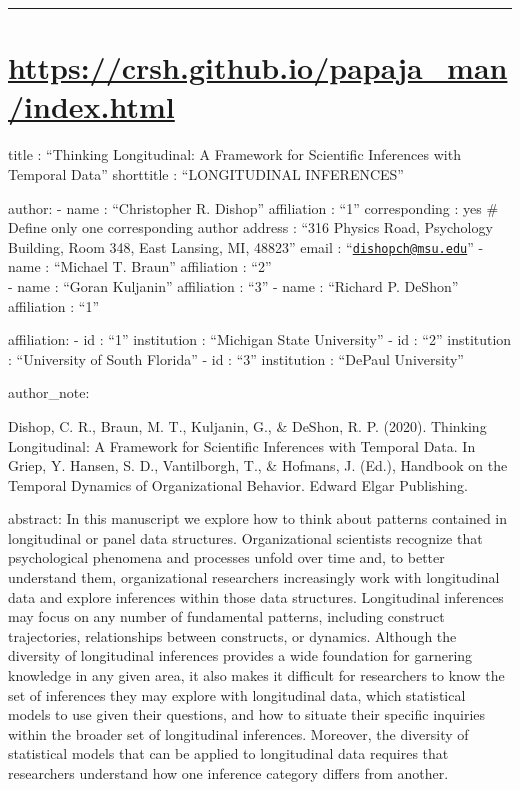 \documentclass[english,,man]{apa6}
\author{Christopher R. Dishop\textsuperscript{1}, Michael T. Braun\textsuperscript{2}, Goran Kuljanin\textsuperscript{3}, \& Richard P. DeShon\textsuperscript{1}}
\affiliation{
\vspace{0.5cm}
\textsuperscript{1} Michigan State University\\\textsuperscript{2} University of South Florida\\\textsuperscript{3} DePaul University}
\date{}
\begin{document}
\begin{center}\rule{0.5\linewidth}{0.5pt}\end{center}

\hypertarget{httpscrsh.github.iopapaja_manindex.html}{%
\section{\texorpdfstring{\url{https://crsh.github.io/papaja_man/index.html}}{https://crsh.github.io/papaja\_man/index.html}}\label{httpscrsh.github.iopapaja_manindex.html}}

title : \enquote{Thinking Longitudinal: A Framework for Scientific Inferences with Temporal Data}
shorttitle : \enquote{LONGITUDINAL INFERENCES}

author:
- name : \enquote{Christopher R. Dishop}
affiliation : \enquote{1}
corresponding : yes \# Define only one corresponding author
address : \enquote{316 Physics Road, Psychology Building, Room 348, East Lansing, MI, 48823}
email : \enquote{\href{mailto:dishopch@msu.edu}{\nolinkurl{dishopch@msu.edu}}}
- name : \enquote{Michael T. Braun}
affiliation : \enquote{2}\\
- name : \enquote{Goran Kuljanin}
affiliation : \enquote{3}
- name : \enquote{Richard P. DeShon}
affiliation : \enquote{1}

affiliation:
- id : \enquote{1}
institution : \enquote{Michigan State University}
- id : \enquote{2}
institution : \enquote{University of South Florida}
- id : \enquote{3}
institution : \enquote{DePaul University}

author\_note: \textbar{}

Dishop, C. R., Braun, M. T., Kuljanin, G., \& DeShon, R. P. (2020). Thinking Longitudinal: A Framework for Scientific Inferences with Temporal Data. In Griep, Y. Hansen, S. D., Vantilborgh, T., \& Hofmans, J. (Ed.), Handbook on the Temporal Dynamics of Organizational Behavior. Edward Elgar Publishing.

abstract: \textbar{}
In this manuscript we explore how to think about patterns contained in longitudinal or panel data structures. Organizational scientists recognize that psychological phenomena and processes unfold over time and, to better understand them, organizational researchers increasingly work with longitudinal data and explore inferences within those data structures. Longitudinal inferences may focus on any number of fundamental patterns, including construct trajectories, relationships between constructs, or dynamics. Although the diversity of longitudinal inferences provides a wide foundation for garnering knowledge in any given area, it also makes it difficult for researchers to know the set of inferences they may explore with longitudinal data, which statistical models to use given their questions, and how to situate their specific inquiries within the broader set of longitudinal inferences. Moreover, the diversity of statistical models that can be applied to longitudinal data requires that researchers understand how one inference category differs from another.
\end{document}
